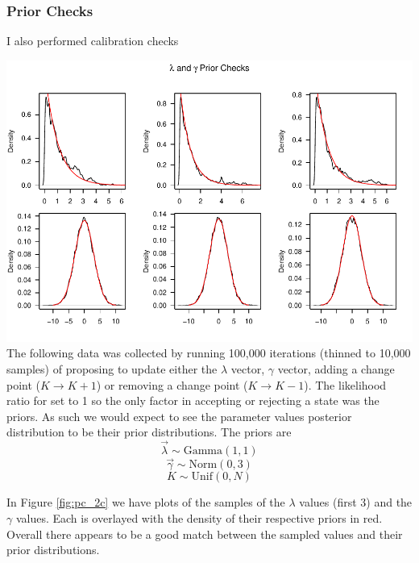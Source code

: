 \documentclass[11pt,a4paper]{article}
\numberwithin{equation}{section}
\begin{document}
\hypertarget{prior-checks-1}{%
\subsubsection{Prior Checks}\label{prior-checks-1}}

I also performed calibration checks

\includegraphics{thesis_draft_files/figure-latex/prior_checks_2c-1.pdf}
The following data was collected by running 100,000 iterations (thinned
to 10,000 samples) of proposing to update either the \(\lambda\) vector,
\(\gamma\) vector, adding a change point (\(K \rightarrow K + 1\)) or
removing a change point (\(K \rightarrow K - 1\)). The likelihood ratio
for set to 1 so the only factor in accepting or rejecting a state was
the priors. As such we would expect to see the parameter values
posterior distribution to be their prior distributions. The priors are
\[\vec\lambda \sim \text{Gamma}(1,1)\]
\[\vec\gamma \sim \text{Norm}(0,3)\] \[K \sim \text{Unif}(0,N)\]

In Figure \ref{fig:pc_2c} we have plots of the samples of the
\(\lambda\) values (first 3) and the \(\gamma\) values. Each is
overlayed with the density of their respective priors in red. Overall
there appears to be a good match between the sampled values and their
prior distributions.
\end{document}
